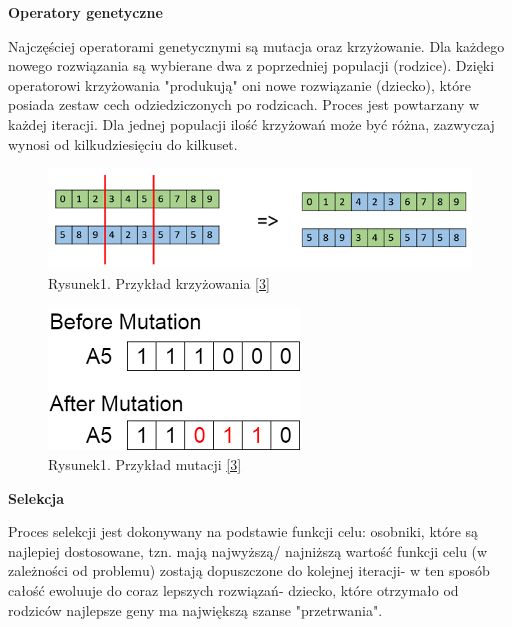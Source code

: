 \documentclass[a4paper, twoside, 12pt, justified]{article}
\begin{document}
	\begin{center}
		\textbf{Operatory genetyczne}
	\end{center}  
	
	Najczęściej operatorami genetycznymi są mutacja oraz krzyżowanie. Dla każdego nowego rozwiązania są wybierane dwa z poprzedniej populacji (rodzice). Dzięki operatorowi krzyżowania "produkują" oni nowe rozwiązanie (dziecko), które posiada zestaw cech odziedziczonych po rodzicach. Proces jest powtarzany w każdej iteracji. Dla jednej populacji ilość krzyżowań może być różna, zazwyczaj wynosi od kilkudziesięciu do kilkuset.
	
	\begin{figure}[h]
		\includegraphics[scale=1]{cross}
		\centering
		\\
		{Rysunek1. Przykład krzyżowania \hyperlink{cross}{[3]} } 
	\end{figure}

	\newpage

	\begin{figure}[h]
		\includegraphics[scale=1]{mutation}
		\centering
		\\
		{Rysunek1. Przykład mutacji \hyperlink{mutation}{[3]} } 
	\end{figure}
	
	\begin{center}
		\textbf{Selekcja}
	\end{center}    
	
	Proces selekcji jest dokonywany na podstawie funkcji celu: osobniki, które są najlepiej dostosowane, tzn. mają najwyższą/ najniższą wartość funkcji celu (w zależności od problemu) zostają dopuszczone do kolejnej iteracji- w ten sposób całość ewoluuje do coraz lepszych rozwiązań- dziecko, które otrzymało od rodziców najlepsze geny ma największą szanse "przetrwania".
	
\end{document}
